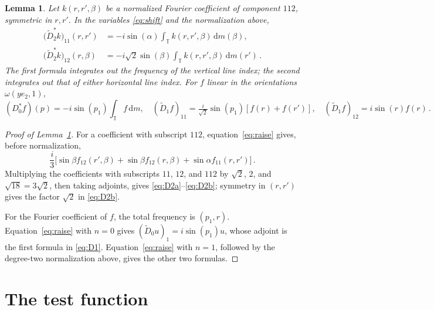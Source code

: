 \documentclass[11pt]{amsart}
\theoremstyle{plain}
\newtheorem{lemma}[theorem]{Lemma}
\theoremstyle{definition}
\newcommand{\T}{\mathbb T}
\newcommand{\1}{\mathbf 1}
\newcommand{\dd}{\,\mathrm d}
\begin{document}
	\begin{lemma}\label{lem:formulas}
		Let $k(r,r',\beta)$ be a normalized Fourier coefficient of component
		$112$, symmetric in $r,r'$.  In the variables \eqref{eq:shift} and the
		normalization above,
		\begin{align}
			\bigl(\widetilde D_2^*k\bigr)_{11}(r,r')
			&=-i\sin(\alpha)\int_\T k(r,r',\beta)\dd m(\beta),\label{eq:D2a}\\
			\bigl(\widetilde D_2^*k\bigr)_{12}(r,\beta)
			&=-i\sqrt2\sin(\beta)\int_\T k(r,r',\beta)\dd m(r')\, .\label{eq:D2b}
		\end{align}
		The first formula integrates out the frequency of the vertical line
		index; the second integrates out that of either horizontal line index.
		For $f$ linear in the orientations $\omega(ye_2,1)$,
		\begin{equation}\label{eq:D1}
			(D_0^*f)(p)=-i\sin (p_1)\int_\T f\dd m,\quad
			(\widetilde D_1f)_{11}=\tfrac i{\sqrt2}\sin (p_1)[f(r)+f(r')],\quad
			(\widetilde D_1f)_{12}=i\sin (r)f(r)\, .
		\end{equation}
	\end{lemma}
	
	\begin{proof}[Proof of Lemma~\ref{lem:formulas}]
		For a coefficient with subscript $112$, equation~\eqref{eq:raise} gives, before
		normalization,
		\[
		\frac i3\bigl[\sin\beta f_{12}(r',\beta)
		+\sin\beta f_{12}(r,\beta)+\sin\alpha f_{11}(r,r')\bigr]\, .
		\]
		Multiplying the coefficients with subscripts $11$, $12$, and $112$ by
		$\sqrt2$, $2$, and $\sqrt{18}=3\sqrt2$, then taking adjoints, gives
		\eqref{eq:D2a}--\eqref{eq:D2b}; symmetry in $(r,r')$ gives the factor
		$\sqrt2$ in \eqref{eq:D2b}.
		
		For the Fourier coefficient of $f$, the total frequency is $(p_1,r)$.
		Equation~\eqref{eq:raise} with $n=0$ gives
		$(\widetilde D_0u)_1=i\sin(p_1)u$, whose adjoint is the first formula in
		\eqref{eq:D1}.  Equation~\eqref{eq:raise} with $n=1$, followed by the
		degree-two normalization above, gives the other two formulas.
	\end{proof}
	
	\section{The test function}\label{sec:evaluation}
	
\end{document}
